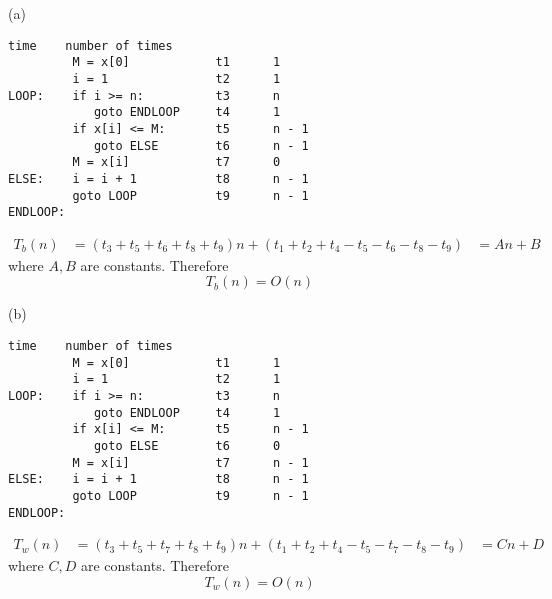 (a)
\begin{Verbatim}[frame=single,fontsize=\small]
                             time    number of times
         M = x[0]            t1      1 
         i = 1               t2      1
LOOP:    if i >= n:          t3      n
            goto ENDLOOP     t4      1
         if x[i] <= M:       t5      n - 1
            goto ELSE        t6      n - 1
         M = x[i]            t7      0
ELSE:    i = i + 1           t8      n - 1
         goto LOOP           t9      n - 1
ENDLOOP:
\end{Verbatim}
\begin{align*}
T_b(n)
&= (t_3 + t_5 + t_6 + t_8 + t_9)n + (t_1 + t_2 + t_4 - t_5 - t_6 - t_8 - t_9)
&= An + B
\end{align*}
where $A, B$ are constants.
Therefore
\[
T_b(n) = O(n)
\]

(b)
\begin{Verbatim}[frame=single,fontsize=\small]
                             time    number of times
         M = x[0]            t1      1 
         i = 1               t2      1
LOOP:    if i >= n:          t3      n
            goto ENDLOOP     t4      1
         if x[i] <= M:       t5      n - 1
            goto ELSE        t6      0
         M = x[i]            t7      n - 1
ELSE:    i = i + 1           t8      n - 1
         goto LOOP           t9      n - 1
ENDLOOP:
\end{Verbatim}
\begin{align*}
T_w(n)
&= (t_3 + t_5 + t_7 + t_8 + t_9)n + (t_1 + t_2 + t_4 - t_5 - t_7 - t_8 - t_9)
&= Cn + D
\end{align*}
where $C, D$ are constants.
Therefore
\[
T_w(n) = O(n)
\]
